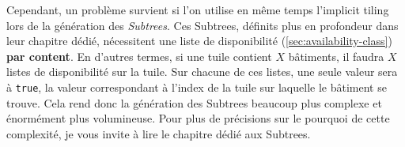 Cependant, un problème survient si l'on utilise en même temps l'implicit tiling lors de la génération des \textit{Subtrees}. Ces Subtrees, définits plus en profondeur dans leur chapitre dédié, nécessitent une liste de disponibilité (\autoref{sec:availability-class}) \textbf{par content}. En d'autres termes, si une tuile contient $X$ bâtiments, il faudra $X$ listes de disponibilité sur la tuile. Sur chacune de ces listes, une seule valeur sera à \texttt{true}, la valeur correspondant à l'index de la tuile sur laquelle le bâtiment se trouve. Cela rend donc la génération des Subtrees beaucoup plus complexe et énormément plus volumineuse. Pour plus de précisions sur le pourquoi de cette complexité, je vous invite à lire le chapitre dédié aux Subtrees.